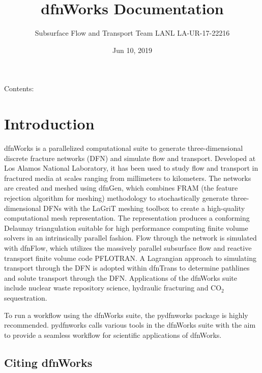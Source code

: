 \documentclass[letterpaper,10pt,english]{sphinxmanual}
\title{dfnWorks Documentation}
\date{Jun 10, 2019}
\author{Subsurface Flow and Transport Team 
 LANL 
 LA-UR-17-22216}
\begin{document}
\pagestyle{empty}
\maketitle
\pagestyle{plain}
\sphinxtableofcontents
\pagestyle{normal}
\label{\detokenize{index_docs::doc}}


Contents:


\chapter{Introduction}
\label{\detokenize{intro:introduction}}\label{\detokenize{intro::doc}}
dfnWorks is a parallelized computational suite to generate three-dimensional
discrete fracture networks (DFN) and simulate flow and transport. Developed at
Los Alamos National Laboratory, it has been used to study flow and transport
in fractured media at scales ranging from millimeters to kilometers. The
networks are created and meshed using dfnGen, which combines FRAM (the feature
rejection algorithm for meshing) methodology to stochastically generate
three-dimensional DFNs with the LaGriT meshing toolbox to create a high-quality
computational mesh representation. The representation produces a conforming
Delaunay triangulation suitable for high performance computing finite volume
solvers in an intrinsically parallel fashion. Flow through the network is
simulated with dfnFlow, which utilizes the massively parallel subsurface flow
and reactive transport finite volume code PFLOTRAN. A Lagrangian approach to
simulating transport through the DFN is adopted within dfnTrans to determine
pathlines and solute transport through the DFN. Applications of the dfnWorks
suite include nuclear waste repository science, hydraulic fracturing and
CO$_{\text{2}}$ sequestration.

To run a workflow using the dfnWorks suite, the pydfnworks package is
highly recommended. pydfnworks calls various tools in the dfnWorks suite with
the aim to provide a seamless workflow for scientific applications of dfnWorks.


\section{Citing dfnWorks}
\label{\detokenize{intro:citing-dfnworks}}
\end{document}
